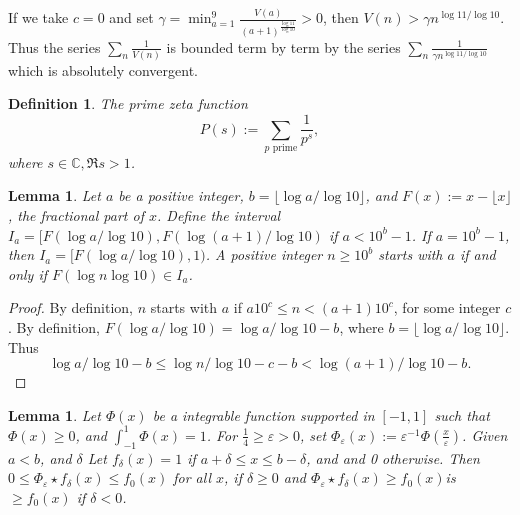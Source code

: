\documentclass{article}
\newtheorem{lemma}[section]{Lemma}
\newtheorem{definition}[section]{Definition}
\newcommand{\CC}{\mathbb{C}}
\begin{document}
If we take $c=0$ and set $\gamma = \min_{a=1}^9
\frac{V(a)}{(a+1)^{\frac{\log 11}{\log 10}}} > 0$, then $V(n) > \gamma n^{\log 11/\log 10}$.
Thus the series $\sum_n \frac{1}{V(n)}$ is bounded
term by term by the series $\sum_n \frac{1}{\gamma n^{\log 11/\log
    10}}$ which is absolutely convergent.
\begin{definition}
  The \emph{prime zeta function}
  \begin{displaymath}
    P(s) := \sum_{p \text{ prime}} \frac{1}{p^s},
  \end{displaymath}
  where $s \in \CC, \Re s > 1$.
\end{definition}
\begin{lemma}
  \label{lem:interval}
  Let $a$ be a positive integer, $b = \lfloor \log a/\log 10\rfloor$,
  and $F(x) := x - \lfloor x \rfloor$, the fractional part of $x$.
  Define the interval $I_a = [F(\log a/\log 10), F(\log (a+1)/\log
  10)$ if $a < 10^b-1$. If $a=10^b-1$, then $I_a = [F(\log a/\log
  10), 1)$.
  A positive integer $n\ge 10^b$ starts with $a$ if and only if
  $F(\log n\log 10) \in I_a$.
\end{lemma}
\begin{proof}
  By definition, $n$ starts with $a$ if $a 10^c \le n < (a+1)10^c$,
  for some integer $c$. By definition,
  $F(\log a/\log 10) = \log a/\log 10 - b$, where $b = \lfloor \log
  a/\log 10 \rfloor$. Thus
  \begin{displaymath}
    \log a/\log 10 -b \le \log n/\log 10 - c -b < \log(a+1)/\log 10 - b.
  \end{displaymath}
\end{proof}
\begin{lemma}
  \label{lem:upper:bound}
  Let $\Phi(x)$ be a integrable function supported in $[-1,1]$ such
  that $\Phi(x) \ge 0$, and $\int_{-1}^1 \Phi(x) = 1$.  For
  $\frac{1}{4} \ge \varepsilon > 0$, set
  $\Phi_\varepsilon(x) := \varepsilon^{-1} \Phi \left(
    \frac{x}{\varepsilon} \right)$.  Given $a < b$, and $\delta$ Let
  $f_\delta(x)=1$ if $a + \delta \le x \le b - \delta$, and and 0
  otherwise. Then
  $0 \le \Phi_\varepsilon \star f_\delta(x) \le f_0(x)$ for all $x$,
  if $\delta \ge 0$ and
  $\Phi_\varepsilon \star f_\delta(x) \ge f_0(x)$is $\ge f_0(x)$ if $\delta < 0$.
\end{lemma}
\end{document}
